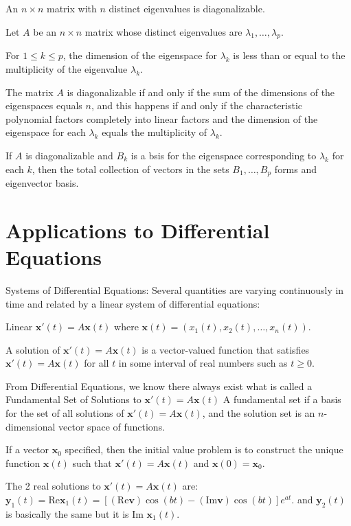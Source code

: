 \documentclass[../linalg.tex]{subfiles}
\begin{document}
\begin{theorem}
    An $n\times n$ matrix with $n$ distinct eigenvalues is diagonalizable.
\end{theorem}

\begin{theorem}
    Let $A$ be an $n \times n$ matrix whose distinct eigenvalues are $\lambda_1,\dots,\lambda_p$.

    For $1\leq k\leq p$, the dimension of the eigenspace for $\lambda_k$ is less than or equal to the multiplicity of the eigenvalue $\lambda_k$.

    The matrix $A$ is diagonalizable if and only if the sum of the dimensions of the eigenspaces equals $n$, and this happens if and only if the characteristic polynomial factors completely into linear factors and the dimension of the eigenspace for each 
    $\lambda_k$ equals the multiplicity of $\lambda_k$.

    If $A$ is diagonalizable and $B_k$ is a bsis for the eigenspace corresponding to $\lambda_k$ for each $k$, then the total collection of vectors in the sets $B_1,\dots,B_p$ forms and eigenvector basis.
\end{theorem}

\section{Applications to Differential Equations}
Systems of Differential Equations: Several quantities are varying continuously in time and related by a linear system of differential equations:

Linear $\textbf{x}'(t)=A\textbf{x}(t)$ where $\textbf{x}(t)=(x_1(t),x_2(t),\dots,x_n(t))$.

A solution of $\textbf{x}'(t)=A\textbf{x}(t)$ is a vector-valued function that satisfies $\textbf{x}'(t)=A\textbf{x}(t)$ for all $t$ in some interval of real numbers such as $t\geq 0$.

From Differential Equations, we know there always exist what is called a Fundamental Set of Solutions to $\textbf{x}'(t)=A\textbf{x}(t)$ A fundamental set if a basis for the set of all solutions of $\textbf{x}'(t)=A\textbf{x}(t)$, and the solution set is an 
$n$-dimensional vector space of functions.

If a vector $\textbf{x}_0$ specified, then the initial value problem is to construct the unique function $\textbf{x}(t)$ such that $\textbf{x}'(t)=A\textbf{x}(t)$ and $\textbf{x}(0)=\textbf{x}_0$.

The 2 real solutions to $\textbf{x}'(t)=A\textbf{x}(t)$ are: $\textbf{y}_1(t)=\text{Re}\textbf{x}_1(t)=[(\text{Re}\textbf{v})\cos (bt)-(\text{Im}\textbf{v})\cos (bt)]e^{at}$. and $\textbf{y}_2(t)$ is basically the same but it is Im $\textbf{x}_1(t)$.
\end{document}
